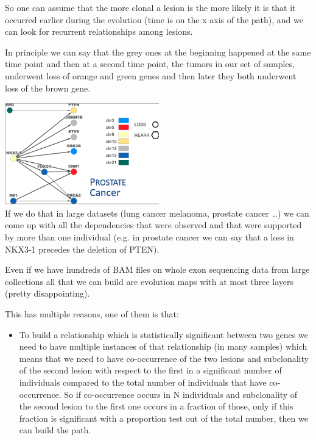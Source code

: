 So one can assume that the more clonal a lesion is the more likely it is that it
occurred earlier during the evolution (time is on the x axis of the path), and
we can look for recurrent relationships among lesions.

In principle we can say that the grey ones at the beginning happened at the same
time point and then at a second time point, the tumors in our set of samples,
underwent loss of orange and green genes and then later they both underwent loss
of the brown gene.

\includegraphics[width=2.63403in,height=1.74097in]{image6.png}\\

If we do that in
large datasets (lung cancer melanoma, prostate cancer \ldots) we can come up
with all the dependencies that were observed and that were supported by more
than one individual (e.g. in prostate cancer we can say that a loss in NKX3-1
precedes the deletion of PTEN).

Even if we have hundreds of BAM files on whole exon sequencing data from large
collections all that we can build are evolution maps with at most three layers
(pretty disappointing).

This has multiple reasons, one of them is that:

\begin{itemize}
\item
  To build a relationship which is statistically significant between two genes
  we need to have multiple instances of that relationship (in many samples)
  which means that we need to have co-occurrence of the two lesions and
  subclonality of the second lesion with respect to the first in a significant
  number of individuals compared to the total number of individuals that have
  co-occurrence. So if co-occurrence occurs in N individuals and subclonality of
  the second lesion to the first one occurs in a fraction of those, only if this
  fraction is significant with a proportion test out of the total number, then
  we can build the path.
\end{itemize}

